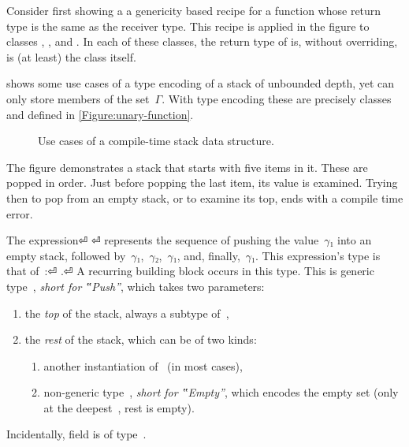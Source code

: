 Consider first  showing a a genericity based recipe for 
  a function whose return type 
  is the same as the receiver type.
  This recipe is applied in the figure to classes , , and .
  In each of these classes, the return type of  is, 
  without overriding, is (at least) the class itself. 

 shows some use cases of a type encoding of
  a stack of unbounded depth, yet can only store members of the set~$Γ$.
With type encoding these are precisely classes~
  and  defined in \cref{Figure:unary-function}.

\begin{figure}[H]
  \caption{\label{Figure:stack-use-cases}%
    Use cases of a compile-time stack data structure.
  }
\end{figure}

The figure demonstrates a stack that starts with five items in it.
These are popped in order. Just before popping the last item, its
  value is examined.
Trying then to pop from an empty stack, or to examine its top, ends with
  a compile time error.

The expression⏎
  \mbox{\qquad\qquad} ⏎
represents the sequence of pushing the value~$γ₁$ into an
empty stack, followed by~$γ₁$,~$γ₂$,~$γ₁$, and, finally,~$γ₁$.
This expression's type is that of~:⏎
\mbox{\qquad\qquad} .⏎
A recurring building block occurs in this type.
This is generic type~, \emph{short for ‟Push”}, which takes two parameters:
  \begin{enumerate}
    \item the \emph{top} of the stack, always a subtype of~,
    \item the \emph{rest} of the stack, which can be of two kinds:
          \begin{enumerate}
            \item another instantiation of~ (in most cases),
            \item non-generic type~, \emph{short for ‟Empty”}, which encodes the empty
                  set (only at the deepest~, rest is empty).
          \end{enumerate}
  \end{enumerate}
Incidentally,  field  is of type~.

